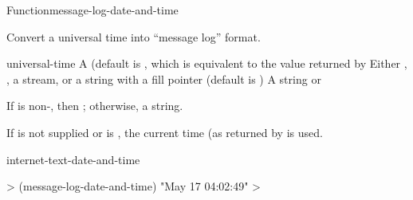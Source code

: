 \documentclass[10pt,twoside,english,pdftex]{article}
\begin{document}
\begin{functiondoc}{Function}{message-log-date-and-time}{%
    }
% 

\fnsyntax

\fnpurpose Convert a universal time into ``message log''
 format.

\fnpackage {}

\fnmodule {}

\fnargs
\begin{args}{universal-time}
 A  (default is \nil,
  which is equivalent to the value returned by
\arg[destination] Either \nil, , a stream, or a string with a fill 
pointer (default is \nil)
\arg[result] A string or \nil{}
\end{args}

\fnreturns If  is non-\nil, then \nil; otherwise, a string.

\fndescription
{}%
%
If  is not supplied or is \nil, the current time
(as returned by  is used.

\begin{alsos}{internet-text-date-and-time}
\end{alsos}

\fnexample
%
\W\supp
\begin{example}
  > (message-log-date-and-time)
  "May 17 04:02:49"
  >
\end{example}

\end{functiondoc}

\end{document}
